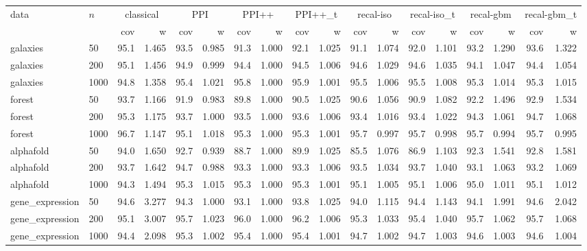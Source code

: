 \begin{tabular}{llrrrrrrrrrrrrrrrr}\toprule
data & $n$ & \multicolumn{2}{c}{classical} & \multicolumn{2}{c}{PPI} & \multicolumn{2}{c}{PPI++} & \multicolumn{2}{c}{PPI++\_t} & \multicolumn{2}{c}{recal-iso} & \multicolumn{2}{c}{recal-iso\_t} & \multicolumn{2}{c}{recal-gbm} & \multicolumn{2}{c}{recal-gbm\_t}\\
 & & cov & w & cov & w & cov & w & cov & w & cov & w & cov & w & cov & w & cov & w\\\midrule
galaxies & 50 & 95.1 & 1.465 & 93.5 & 0.985 & 91.3 & 1.000 & 92.1 & 1.025 & 91.1 & 1.074 & 92.0 & 1.101 & 93.2 & 1.290 & 93.6 & 1.322\\
galaxies & 200 & 95.1 & 1.456 & 94.9 & 0.999 & 94.4 & 1.000 & 94.5 & 1.006 & 94.6 & 1.029 & 94.6 & 1.035 & 94.1 & 1.047 & 94.4 & 1.054\\
galaxies & 1000 & 94.8 & 1.358 & 95.4 & 1.021 & 95.8 & 1.000 & 95.9 & 1.001 & 95.5 & 1.006 & 95.5 & 1.008 & 95.3 & 1.014 & 95.3 & 1.015\\
forest & 50 & 93.7 & 1.166 & 91.9 & 0.983 & 89.8 & 1.000 & 90.5 & 1.025 & 90.6 & 1.056 & 90.9 & 1.082 & 92.2 & 1.496 & 92.9 & 1.534\\
forest & 200 & 95.3 & 1.175 & 93.7 & 1.000 & 93.5 & 1.000 & 93.6 & 1.006 & 93.4 & 1.016 & 93.4 & 1.022 & 94.3 & 1.061 & 94.7 & 1.068\\
forest & 1000 & 96.7 & 1.147 & 95.1 & 1.018 & 95.3 & 1.000 & 95.3 & 1.001 & 95.7 & 0.997 & 95.7 & 0.998 & 95.7 & 0.994 & 95.7 & 0.995\\
alphafold & 50 & 94.0 & 1.650 & 92.7 & 0.939 & 88.7 & 1.000 & 89.9 & 1.025 & 85.5 & 1.076 & 86.9 & 1.103 & 92.3 & 1.541 & 92.8 & 1.581\\
alphafold & 200 & 93.7 & 1.642 & 94.7 & 0.988 & 93.3 & 1.000 & 93.3 & 1.006 & 93.5 & 1.034 & 93.7 & 1.040 & 93.1 & 1.063 & 93.2 & 1.069\\
alphafold & 1000 & 94.3 & 1.494 & 95.3 & 1.015 & 95.3 & 1.000 & 95.3 & 1.001 & 95.1 & 1.005 & 95.1 & 1.006 & 95.0 & 1.011 & 95.1 & 1.012\\
gene\_expression & 50 & 94.6 & 3.277 & 94.3 & 1.000 & 93.1 & 1.000 & 93.8 & 1.025 & 94.0 & 1.115 & 94.4 & 1.143 & 94.1 & 1.991 & 94.6 & 2.042\\
gene\_expression & 200 & 95.1 & 3.007 & 95.7 & 1.023 & 96.0 & 1.000 & 96.2 & 1.006 & 95.3 & 1.033 & 95.4 & 1.040 & 95.7 & 1.062 & 95.7 & 1.068\\
gene\_expression & 1000 & 94.4 & 2.098 & 95.3 & 1.002 & 95.4 & 1.000 & 95.4 & 1.001 & 94.7 & 1.002 & 94.7 & 1.003 & 94.6 & 1.003 & 94.6 & 1.004\\

\end{tabular}
